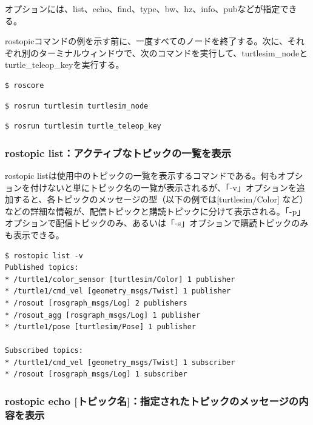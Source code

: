 オプションには、list、echo、find、type、bw、hz、info、pubなどが指定できる。

rostopicコマンドの例を示す前に、一度すべてのノードを終了する。次に、それぞれ別のターミナルウィンドウで、次のコマンドを実行して、turtlesim\_nodeとturtle\_teleop\_keyを実行する。

\begin{lstlisting}[language=ROS]
$ roscore
\end{lstlisting}

\begin{lstlisting}[language=ROS]
$ rosrun turtlesim turtlesim_node
\end{lstlisting}

\begin{lstlisting}[language=ROS]
$ rosrun turtlesim turtle_teleop_key
\end{lstlisting}

\subsubsection{rostopic list：アクティブなトピックの一覧を表示}

rostopic listは使用中のトピックの一覧を表示するコマンドである。何もオプションを付けないと単にトピック名の一覧が表示されるが、「-v」オプションを追加すると、各トピックのメッセージの型（以下の例では[turtlesim/Color] など）などの詳細な情報が、配信トピックと購読トピックに分けて表示される。「-p」オプションで配信トピックのみ、あるいは「-s」オプションで購読トピックのみも表示できる。

\begin{lstlisting}[language=ROS]
$ rostopic list -v
Published topics:
* /turtle1/color_sensor [turtlesim/Color] 1 publisher
* /turtle1/cmd_vel [geometry_msgs/Twist] 1 publisher
* /rosout [rosgraph_msgs/Log] 2 publishers
* /rosout_agg [rosgraph_msgs/Log] 1 publisher
* /turtle1/pose [turtlesim/Pose] 1 publisher

Subscribed topics:
* /turtle1/cmd_vel [geometry_msgs/Twist] 1 subscriber
* /rosout [rosgraph_msgs/Log] 1 subscriber
\end{lstlisting}

\subsubsection{rostopic echo [トピック名]：指定されたトピックのメッセージの内容を表示}

